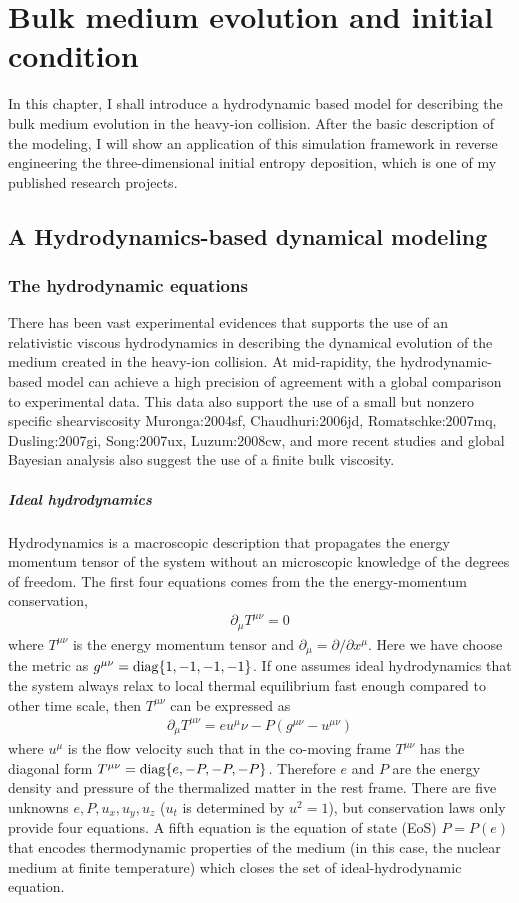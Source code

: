 \chapter{Bulk medium evolution and initial condition}
In this chapter, I shall introduce a hydrodynamic based model for describing the bulk medium evolution in the heavy-ion collision.
After the basic description of the modeling, I will show an application of this simulation framework in reverse engineering the three-dimensional initial entropy deposition, which is one of my published research projects.

\section{A Hydrodynamics-based dynamical modeling}
\subsection{The hydrodynamic equations}
There has been vast experimental evidences that supports the use of an relativistic viscous hydrodynamics in describing the dynamical evolution of the medium created in the heavy-ion collision.
At mid-rapidity, the hydrodynamic-based model can achieve a high precision of agreement with a global comparison to experimental data. 
This data also support the use of a small but nonzero specific shearviscosity {Muronga:2004sf, Chaudhuri:2006jd, Romatschke:2007mq, Dusling:2007gi, Song:2007ux, Luzum:2008cw}, and more recent studies and global Bayesian analysis also suggest the use of a finite bulk viscosity.

\paragraph{Ideal hydrodynamics} Hydrodynamics is a macroscopic description that propagates the energy momentum tensor of the system without an microscopic knowledge of the degrees of freedom.
The first four equations comes from the the energy-momentum conservation,
\begin{eqnarray}
\partial_\mu T^{\mu\nu} = 0
\end{eqnarray}
where $T^{\mu\nu}$ is the energy momentum tensor and $\partial_\mu = \partial/\partial x^\mu$. 
Here we have choose the metric as $g^{\mu\nu} = \operatorname{diag}\{1, -1, -1, -1\}$.
If one assumes ideal hydrodynamics that the system always relax to local thermal equilibrium fast enough compared to other time scale, then $T^{\mu\nu}$ can be expressed as
\begin{eqnarray}
\partial_\mu T^{\mu\nu} = e u^\mu \nu - P (g^{\mu\nu}-u^{\mu\nu})
\end{eqnarray}
where $u^\mu$ is the flow velocity such that in the co-moving frame  $T^{\mu\nu}$ has the diagonal form $T^{\mu\nu} = \operatorname{diag}\{e, -P, -P, -P\}$.
Therefore $e$ and $P$ are the energy density and pressure of the thermalized matter in the rest frame.
There are five unknowns $e, P, u_x, u_y, u_z$ ($u_t$ is determined by $u^2 = 1$), but conservation laws only provide four equations.
A fifth equation is the equation of state (EoS) $P = P(e)$ that encodes thermodynamic properties of the medium (in this case, the nuclear medium at finite temperature) which closes the set of ideal-hydrodynamic equation.
